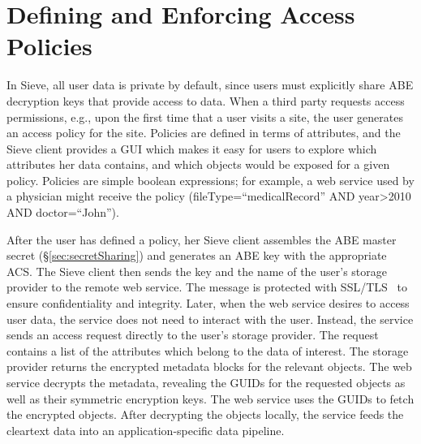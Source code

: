 \section{Defining and Enforcing Access Policies}
\label{sec:policies}

In Sieve, all user data is private by
default, since users must explicitly
share ABE decryption keys that provide
access to data. When a third party requests
access permissions, e.g., upon the first
time that a user visits a site, the user
generates an access policy for the site.
Policies are defined in terms of attributes,
and the Sieve client provides a GUI which
makes it easy for users to explore which
attributes her data contains, and which
objects would be exposed for a given policy.
Policies are simple boolean expressions;
for example, a web service used by a
physician might receive the policy
(fileType=``medicalRecord''
AND year>2010 AND doctor=``John'').

After the user has defined a policy, her
Sieve client assembles the ABE master secret
(\S\ref{sec:secretSharing}) and generates
an ABE key with the appropriate ACS. The
Sieve client then sends the key and the name
of the user's storage provider to the remote
web service. The message is protected with SSL/TLS~\cite{tls}
to ensure confidentiality and integrity.
Later, when the web service desires to
access user data, the service does not
need to interact with the user. Instead,
the service sends an access request directly
to the
user's storage provider. The request
contains a list of the attributes which
belong to the data of interest. The
storage provider returns the encrypted
metadata blocks for the relevant objects.
The web service decrypts the metadata,
revealing the GUIDs for the requested
objects as well as their symmetric
encryption keys. The web service uses the
GUIDs to fetch the encrypted objects.
After decrypting the objects locally,
the service feeds the cleartext data
into an application-specific data pipeline.

